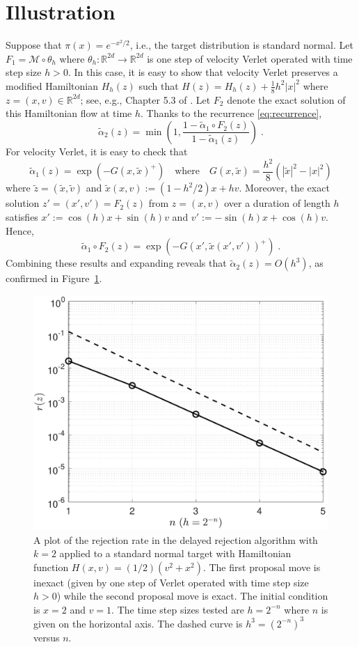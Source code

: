 \documentclass[11pt]{article}
\theoremstyle{plain}%
\begin{document}
\section*{Illustration}


Suppose that $\pi(x) = e^{-x^2 / 2}$, i.e., the target distribution is standard normal.  Let $F_1 = \mathcal{M} \circ \theta_{h}$ where $\theta_h: \mathbb{R}^{2d} \to \mathbb{R}^{2d}$ is one step of velocity Verlet operated with time step size $h>0$.  In this case, it is easy to show that velocity Verlet preserves a modified Hamiltonian $H_h(z)$ such that $H(z) = H_h(z) + \frac{1}{8} h^2 |x|^2$ where $z=(x,v) \in \mathbb{R}^{2d}$; see, e.g., Chapter 5.3 of \cite{BouRabeeEberleLectureNotes2020}. Let $F_2$ denote the exact solution of this Hamiltonian flow at time $h$.  Thanks to the recurrence \eqref{eq:recurrence}, \[
\tilde{\alpha}_2(z) = \min\left(1, \dfrac{1-\tilde{\alpha}_1 \circ F_2(z)}{1-\tilde \alpha_1(z)} \right) \;.
\] For velocity Verlet, it is easy to check that \[
\tilde{\alpha}_1(z) = \exp( - G(x,\tilde{x})^+) \quad \text{where} \quad G(x,\tilde{x}) = \frac{h^2}{8} ( |\tilde{x}|^2 - |x|^2)
\] where $\tilde{z} = (\tilde{x}, \tilde{v})$ and $\tilde{x}(x,v) := (1-h^2/2) x + h v$.   Moreover, the exact solution $z'=(x',v')=F_2(z)$ from $z=(x,v)$ over a duration of length $h$ satisfies $x':=\cos(h) x + \sin(h) v$ and $v':=-\sin(h) x + \cos(h) v$. Hence, \[
\tilde{\alpha}_1 \circ F_2(z) = \exp\left( -G(x',\tilde{x}(x',v'))^+ \right)  \;.
\]  Combining these results and expanding reveals that $\tilde{\alpha}_2(z)  = O(h^3)$, as confirmed in Figure~\ref{fig:alpha2}.

\begin{figure}[ht!] 
\centering
\includegraphics[scale=0.8]{img/alpha2.pdf}
\caption{ A plot of the rejection rate in the delayed rejection algorithm with $k=2$ applied to a standard normal target with Hamiltonian function $H(x,v) = (1/2) (v^2 + x^2)$.  The first proposal move is inexact (given by one step of Verlet operated with time step size $h>0$) while the second proposal move is exact. The initial condition is $x=2$ and $v=1$. The time step sizes tested  are $h=2^{-n}$ where $n$ is given on the horizontal axis. The dashed curve is $h^{3} = (2^{-n})^3$ versus $n$.  }
\label{fig:alpha2}
\end{figure}


\printbibliography

\clearpage


\end{document}
